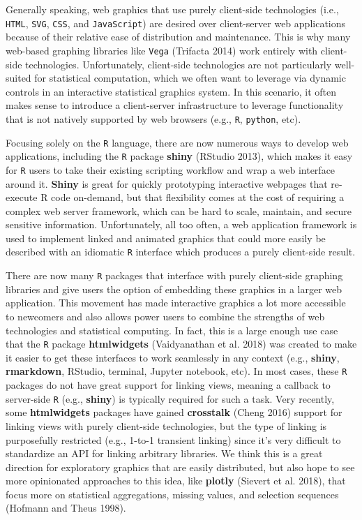 \documentclass[12pt,]{article}
\theoremstyle{definition}
\theoremstyle{definition}
\theoremstyle{definition}
\theoremstyle{remark}
\begin{document}
Generally speaking, web graphics that use purely client-side
technologies (i.e., \texttt{HTML}, \texttt{SVG}, \texttt{CSS}, and
\texttt{JavaScript}) are desired over client-server web applications
because of their relative ease of distribution and maintenance. This is
why many web-based graphing libraries like \texttt{Vega} (Trifacta 2014)
work entirely with client-side technologies. Unfortunately, client-side
technologies are not particularly well-suited for statistical
computation, which we often want to leverage via dynamic controls in an
interactive statistical graphics system. In this scenario, it often
makes sense to introduce a client-server infrastructure to leverage
functionality that is not natively supported by web browsers (e.g.,
\texttt{R}, \texttt{python}, etc).

Focusing solely on the \texttt{R} language, there are now numerous ways
to develop web applications, including the \texttt{R} package
\textbf{shiny} (RStudio 2013), which makes it easy for \texttt{R} users
to take their existing scripting workflow and wrap a web interface
around it. \textbf{Shiny} is great for quickly prototyping interactive
webpages that re-execute R code on-demand, but that flexibility comes at
the cost of requiring a complex web server framework, which can be hard
to scale, maintain, and secure sensitive information. Unfortunately, all
too often, a web application framework is used to implement linked and
animated graphics that could more easily be described with an idiomatic
\texttt{R} interface which produces a purely client-side result.

There are now many \texttt{R} packages that interface with purely
client-side graphing libraries and give users the option of embedding
these graphics in a larger web application. This movement has made
interactive graphics a lot more accessible to newcomers and also allows
power users to combine the strengths of web technologies and statistical
computing. In fact, this is a large enough use case that the \texttt{R}
package \textbf{htmlwidgets} (Vaidyanathan et al. 2018) was created to
make it easier to get these interfaces to work seamlessly in any context
(e.g., \textbf{shiny}, \textbf{rmarkdown}, RStudio, terminal, Jupyter
notebook, etc). In most cases, these \texttt{R} packages do not have
great support for linking views, meaning a callback to server-side
\texttt{R} (e.g., \textbf{shiny}) is typically required for such a task.
Very recently, some \textbf{htmlwidgets} packages have gained
\textbf{crosstalk} (Cheng 2016) support for linking views with purely
client-side technologies, but the type of linking is purposefully
restricted (e.g., 1-to-1 transient linking) since it's very difficult to
standardize an API for linking arbitrary libraries. We think this is a
great direction for exploratory graphics that are easily distributed,
but also hope to see more opinionated approaches to this idea, like
\textbf{plotly} (Sievert et al. 2018), that focus more on statistical
aggregations, missing values, and selection sequences (Hofmann and Theus
1998).
\end{document}
